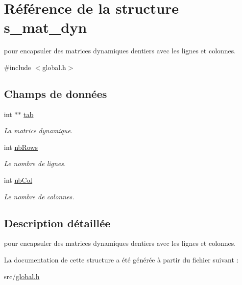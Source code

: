 \hypertarget{structs__mat__dyn}{}\section{Référence de la structure s\+\_\+mat\+\_\+dyn}
\label{structs__mat__dyn}


pour encapsuler des matrices dynamiques d\textquotesingle{}entiers avec les lignes et colonnes.  




{\ttfamily \#include $<$global.\+h$>$}

\subsection*{Champs de données}
\begin{DoxyCompactItemize}
\item 
\mbox{\label{structs__mat__dyn_ad49bf24c5f929d1ed8e22fee5935834b}} 
int $\ast$$\ast$ \mbox{\hyperlink{structs__mat__dyn_ad49bf24c5f929d1ed8e22fee5935834b}{tab}}
\begin{DoxyCompactList}\small\item\em La matrice dynamique. \end{DoxyCompactList}\item 
\mbox{\label{structs__mat__dyn_a79216b74e382c29c63ee9be03b8eda5f}} 
int \mbox{\hyperlink{structs__mat__dyn_a79216b74e382c29c63ee9be03b8eda5f}{nb\+Rows}}
\begin{DoxyCompactList}\small\item\em Le nombre de lignes. \end{DoxyCompactList}\item 
\mbox{\label{structs__mat__dyn_a6469383d7383132548299002f54d4524}} 
int \mbox{\hyperlink{structs__mat__dyn_a6469383d7383132548299002f54d4524}{nb\+Col}}
\begin{DoxyCompactList}\small\item\em Le nombre de colonnes. \end{DoxyCompactList}\end{DoxyCompactItemize}


\subsection{Description détaillée}
pour encapsuler des matrices dynamiques d\textquotesingle{}entiers avec les lignes et colonnes. 

La documentation de cette structure a été générée à partir du fichier suivant \+:\begin{DoxyCompactItemize}
\item 
src/\mbox{\hyperlink{global_8h}{global.\+h}}\end{DoxyCompactItemize}
